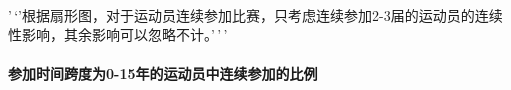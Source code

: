 \documentclass[11pt]{article}
\begin{document}
    \begin{center}
    \end{center}
    { \hspace*{\fill} \\}
    
    '\,`'根据扇形图，对于运动员连续参加比赛，只考虑连续参加2-3届的运动员的连续性影响，其余影响可以忽略不计。'\,'\,'

    \paragraph{参加时间跨度为0-15年的运动员中连续参加的比例}\label{ux53c2ux52a0ux65f6ux95f4ux8de8ux5ea6ux4e3a0-15ux5e74ux7684ux8fd0ux52a8ux5458ux4e2dux8fdeux7eedux53c2ux52a0ux7684ux6bd4ux4f8b}
\end{document}
